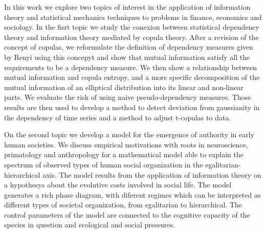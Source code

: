 In this work we explore two topics of interest in the application of information theory and statistical mechanics techniques to problems in finance, economics and sociology. In the fisrt topic we study the conexion between statistical dependency theory and information theory mediated by copula theory. After a revision of the concept of copulas, we reformulate the definition of dependency measures given by Renyi \citep{Renyi1959} using this concepyt and show that mutual information satisfy all the requirements to be a dependency measure. We then show a relationship between mutual information and copula entropy, and a more specific decomposition of the mutual information of an elliptical distribution into its linear and non-linear parts. We evaluate the risk of using naive pseudo-dependency measures. Those results are then used to develop a method to detect deviation from gaussianity in the dependency of time series and a method to adjust t-copulas to data\citep{Calsaverini2009}.

On the second topic we develop a model for the emergence of authority in early human societies. We discuss empirical motivations with roots in neuroscience, primatology and anthropology for a mathematical model able to explain the spectrum of observed types of human social organization in the egalitarian-hierarchical axis. The model results from the application of information theory on a hypothesys about the evolutive costs involved in social life. The model generates a rich phase diagram, with diferent regimes which can be interpreted as different types of societal organization, from egalitarian to hierarchical. The control parameters of the model are connected to the cognitive capacity of the species in question and ecological 	and social pressures.